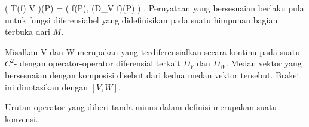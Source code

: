 \mavergleichskettedisp
{\vergleichskette
{ \left( T(f) \circ V \right)(P)
}
{ =} { \left( f(P), \left(D_V f\right)(P) \right)
}
{ } {
}
{ } {
}
{ } {
}
}
{}{}{.}
Pernyataan yang bersesuaian berlaku pula untuk fungsi diferensiabel yang didefinisikan pada suatu himpunan bagian terbuka dari $M$.

{}
{

Misalkan
\mathkor {} {V} {dan} {W} {}
merupakan
yang terdiferensialkan secara kontinu pada suatu
$C^2$-
dengan operator-operator diferensial terkait $D_V$ dan $D_W$. Medan vektor yang bersesuaian dengan komposisi
 disebut
dari kedua medan vektor tersebut. Braket ini dinotasikan dengan $[V,W]$.

}

Urutan operator yang diberi tanda minus dalam definisi merupakan suatu konvensi.


